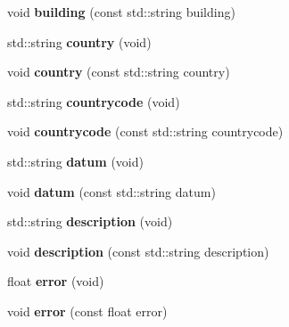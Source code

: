 \begin{DoxyCompactItemize}
\item 
\hypertarget{classGeoloc_a0180350cf71bbe236ea1732ff899e6b7}{
void {\bfseries building} (const std::string building)}
\label{classGeoloc_a0180350cf71bbe236ea1732ff899e6b7}

\item 
\hypertarget{classGeoloc_aac87c5eda4f96316bc8aeccc93162bcd}{
std::string {\bfseries country} (void)}
\label{classGeoloc_aac87c5eda4f96316bc8aeccc93162bcd}

\item 
\hypertarget{classGeoloc_a12a1826eca14f47d87ba7fa258553fca}{
void {\bfseries country} (const std::string country)}
\label{classGeoloc_a12a1826eca14f47d87ba7fa258553fca}

\item 
\hypertarget{classGeoloc_aa9e408431f8b5e8fe24ab60285cc33a4}{
std::string {\bfseries countrycode} (void)}
\label{classGeoloc_aa9e408431f8b5e8fe24ab60285cc33a4}

\item 
\hypertarget{classGeoloc_a171576c5a27eeeb53b5ef82369feabce}{
void {\bfseries countrycode} (const std::string countrycode)}
\label{classGeoloc_a171576c5a27eeeb53b5ef82369feabce}

\item 
\hypertarget{classGeoloc_ac95e0223d271e2cda25d326ff18cf460}{
std::string {\bfseries datum} (void)}
\label{classGeoloc_ac95e0223d271e2cda25d326ff18cf460}

\item 
\hypertarget{classGeoloc_a61095295120bec50fc3e7e1dc2ede606}{
void {\bfseries datum} (const std::string datum)}
\label{classGeoloc_a61095295120bec50fc3e7e1dc2ede606}

\item 
\hypertarget{classGeoloc_abc8581fd218a44e1f1aa720bd3136551}{
std::string {\bfseries description} (void)}
\label{classGeoloc_abc8581fd218a44e1f1aa720bd3136551}

\item 
\hypertarget{classGeoloc_a049430e231b68c4d3ff9436a936400e5}{
void {\bfseries description} (const std::string description)}
\label{classGeoloc_a049430e231b68c4d3ff9436a936400e5}

\item 
\hypertarget{classGeoloc_ac28b4b73a50fa5f7a9560e7902f871ce}{
float {\bfseries error} (void)}
\label{classGeoloc_ac28b4b73a50fa5f7a9560e7902f871ce}

\item 
\hypertarget{classGeoloc_a8fa53f66280a2b0efcaaace3fe12e9ff}{
void {\bfseries error} (const float error)}
\label{classGeoloc_a8fa53f66280a2b0efcaaace3fe12e9ff}


\end{DoxyCompactItemize}
